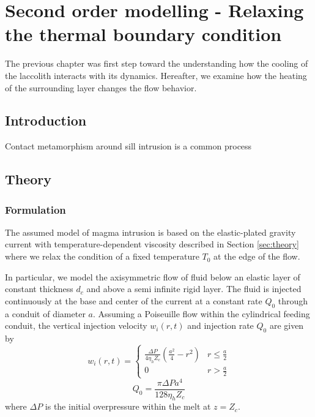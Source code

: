 \chapter{Second  order  modelling  -  Relaxing  the  thermal  boundary
  condition}
\label{chap5}
\minitoc

The previous chapter  was first step toward the  understanding how the
cooling of the  laccolith interacts with its  dynamics.  Hereafter, we
examine  how the  heating of  the surrounding  layer changes  the flow
behavior.

\section{Introduction}
\label{sec:introduction}
 
Contact metamorphism around sill intrusion is a common process

\citep{Everett:2008tn}

\section{Theory}

\subsection{Formulation}
\label{sec:formulation-1}


The assumed  model of magma  intrusion is based on  the elastic-plated
gravity  current  with  temperature-dependent viscosity  described  in
Section \ref{sec:theory} where we relax the condition of a fixed
temperature $T_0$ at the edge of the flow.



In  particular, we  model  the  axisymmetric flow  of  fluid below  an
elastic layer  of constant thickness  $d_c$ and above a  semi infinite
rigid layer. The fluid is injected continuously at the base and center
of the current at a constant  rate $Q_0$ through a conduit of diameter
$a$.   Assuming  a  Poiseuille  flow within  the  cylindrical  feeding
conduit, the vertical injection velocity $w_i(r,t)$ and injection rate
$Q_0$ are given by
\begin{equation}
  w_i(r,t)=
  \begin{cases}
    \frac{ \Delta P}{4 \eta_h Z_{c}} (\frac{a^{2}}{4}-r^{2})& r \le \frac{a}{2}\\
    0 & r > \frac{a}{2}
  \end{cases}
  \label{C4-eq12}
\end{equation}
\begin{equation}
  Q_{0}=\frac{\pi \Delta P a^{4}}{128 \eta_h Z_c}
  \label{C4-eq11}
\end{equation}
where  $\Delta P$  is  the  initial overpressure  within  the melt  at
$z=Z_{c}$.

